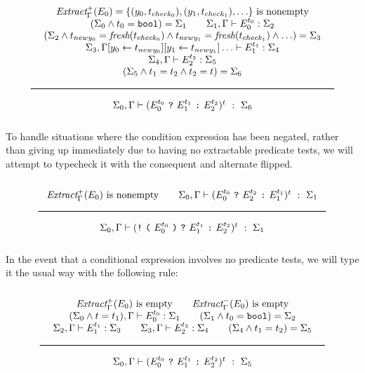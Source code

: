 \[
  \Rule{
  \begin{array}{c}
  \ExtractPos_\Gamma(E_0) = \{ (y_0, t_{check_0}), (y_1, t_{check_1}), \ldots \}
  \text{ is nonempty}
  \\
  (\Sigma_0
  \wedge t_0 = \Bool
  ) = \Sigma_1
  \qquad
  \Sigma_1, \Gamma \vdash E_0^{t_0} : \Sigma_2
  \\
  (\Sigma_2
  \wedge t_{newy_0} = \textit{fresh}(t_{check_0})
  \wedge t_{newy_1} = \textit{fresh}(t_{check_1})
  \wedge \ldots
  ) = \Sigma_3
  \\
  \Sigma_3, \Gamma [ y_0 \leftarrow t_{newy_0} ][ y_1 \leftarrow t_{newy_1} ]\ldots \vdash E_1^{t_1} : \Sigma_4
  \\
  \Sigma_4, \Gamma \vdash E_2^{t_2} : \Sigma_5
  \\
  (\Sigma_5 \wedge t_1 = t_2 \wedge t_2 = t) = \Sigma_{6}
  \end{array}
  }{
  \Sigma_0, \Gamma \vdash ( E_0^{t_0}\ \ThenOp\ E_1^{t_1}\ \ElseOp\ E_2^{t_2})^t\ :\ \Sigma_6}
\]

To handle situations where the condition expression has been negated,
rather than giving up immediately due to having no extractable predicate tests,
we will attempt to typecheck it with the consequent and alternate flipped.

\[
\Rule{
  \ExtractPos_\Gamma(E_0) \text{ is nonempty}
  \qquad
  \Sigma_0, \Gamma \vdash ( E_0^{t_0}\ \ThenOp\ E_2^{t_2}\ \ElseOp\ E_1^{t_1})^t\ :\ \Sigma_1
}{
  \Sigma_0, \Gamma \vdash ( \texttt{!}\ \texttt{(}\ E_0^{t_0}\ \texttt{)}\ \ThenOp\ E_1^{t_1}\ \ElseOp\ E_2^{t_2})^t\ :\ \Sigma_1
}
\]

In the event that a conditional expression involves no predicate tests,
we will type it the usual way with the following rule:

\[
\Rule
{
  \begin{array}{c}
  \ExtractPos_\Gamma(E_0) \text{ is empty}
  \qquad
  \ExtractNeg_\Gamma(E_0) \text{ is empty}
  \\
  (\Sigma_0 \wedge t = t_1), \Gamma \vdash E_0^{t_0} : \Sigma_1 \qquad
  (\Sigma_1 \wedge t_0 = \Bool) = \Sigma_2
  \\
  \Sigma_2, \Gamma \vdash E_1^{t_1} : \Sigma_3 \qquad
  \Sigma_3, \Gamma \vdash E_2^{t_2} : \Sigma_4 \qquad
  (\Sigma_4 \wedge t_1 = t_2) = \Sigma_5
  \end{array}
}{
  \Sigma_0, \Gamma \vdash (E_0^{t_0}\ \ThenOp\ E_1^{t_1}\ \ElseOp\ E_2^{t_2})^t\ :\ \Sigma_5
}
\]

